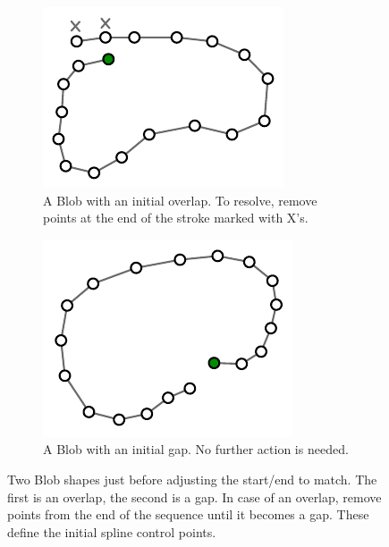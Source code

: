 \begin{figure}
  \centering
  \begin{subfigure}[t]{0.42\textwidth}
    \includegraphics[width=\linewidth]{img/blob-overlap.pdf}
    \caption{A Blob with an initial overlap. To resolve, remove points
      at the end of the stroke marked with X's.}
    \label{fig:blob-overlap}
  \end{subfigure}
  \hspace{1cm} %
  \begin{subfigure}[t]{0.42\textwidth}
    \includegraphics[width=\linewidth]{img/blob-gap.pdf}
    \caption{A Blob with an initial gap. No further action is needed.}
    \label{fig:blob-gap}
  \end{subfigure}
  \caption[Blobs: overlap vs. gap]{Two Blob shapes just before
    adjusting the start/end to match. The first is an overlap, the
    second is a gap. In case of an overlap, remove points from the end
    of the sequence until it becomes a gap. These define the initial
    spline control points.}
  \label{fig:blob}
\end{figure}
